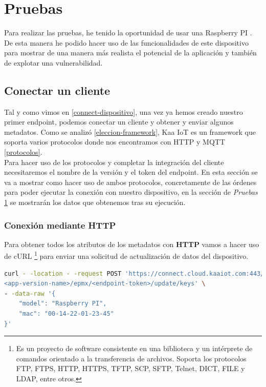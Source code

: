 \chapter{Pruebas} \label{pruebas}

{\color{blue}

Para realizar las pruebas, he tenido la oportunidad de usar una Raspberry PI \cite{raspberry-specs}. De esta manera he podido hacer uso de las funcionalidades de este dispositivo para mostrar de una manera más realista el potencial de la aplicación y también de explotar una vulnerabilidad.

\section{Conectar un cliente}

Tal y como vimos en \ref{connect-dispositivo}, una vez ya hemos creado nuestro primer endpoint, podemos conectar un cliente y obtener y enviar algunos metadatos. Como se analizó \ref{eleccion-framework}, Kaa IoT es un framework que soporta varios protocolos donde nos encontramos con HTTP y MQTT \ref{protocolos}. \\

Para hacer uso de los protocolos y completar la integración del cliente necesitaremos el nombre de la versión y el token del endpoint. En esta sección se va a mostrar como hacer uso de ambos protocolos, concretamente de las órdenes para poder ejecutar la conexión con nuestro dispositivo, en la sección de \textit{Pruebas} \ref{pruebas} se mostrarán los datos que obtenemos tras su ejecución.\\

\subsection{Conexión mediante HTTP} \label{http-connection}

Para obtener todos los atributos de los metadatos con \textbf{HTTP} vamos a hacer uso de cURL \footnote{Es un proyecto de software consistente en una biblioteca y un intérprete de comandos orientado a la transferencia de archivos. Soporta los protocolos FTP, FTPS, HTTP, HTTPS, TFTP, SCP, SFTP, Telnet, DICT, FILE y LDAP, entre otros.} para enviar una solicitud de actualización de datos del dispositivo.

\begin{lstlisting}[language=bash]
curl - -location - -request POST 'https://connect.cloud.kaaiot.com:443/kp1/
<app-version-name>/epmx/<endpoint-token>/update/keys' \
- -data-raw '{
    "model": "Raspberry PI",
    "mac": "00-14-22-01-23-45"
}'
\end{lstlisting}

}
